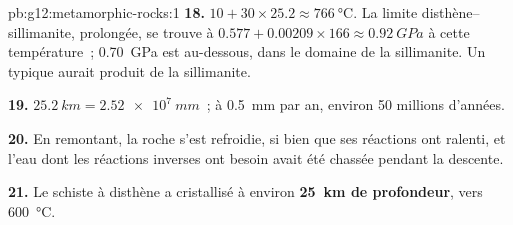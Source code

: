 \begin{solution}{pb:g12:metamorphic-rocks:1}
\textbf{18.} $10 + 30 \times 25.2 \approx \qty{766}{\celsius}$. La limite
disthène--sillimanite, prolongée, se trouve à $0.577 + 0.00209 \times 166
\approx \qty{0.92}{GPa}$ à cette température~; \qty{0.70}{GPa} est
au-dessous, dans le domaine de la sillimanite. Un  typique aurait
produit de la sillimanite.

\textbf{19.} $\qty{25.2}{km} = \qty{2.52e7}{mm}$~; à \qty{0.5}{mm} par an,
environ 50 millions d'années.

\textbf{20.} En remontant, la roche s'est refroidie, si bien que ses
réactions ont ralenti, et l'eau dont les réactions inverses ont besoin
avait été chassée pendant la descente.

\textbf{21.} Le schiste à disthène a cristallisé à environ
\textbf{\qty{25}{km} de profondeur}, vers \qty{600}{\celsius}.
\end{solution}
